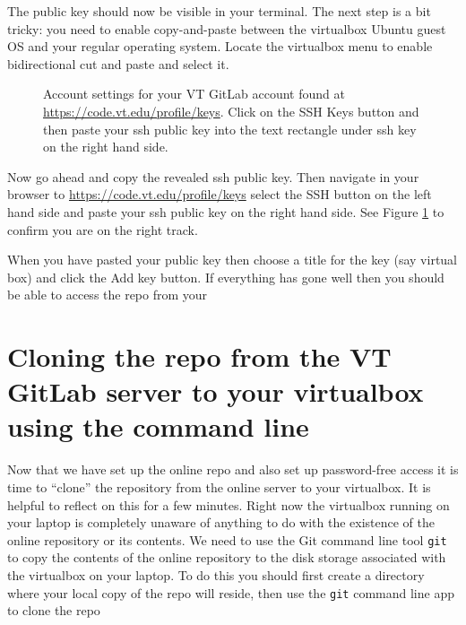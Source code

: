 The public key should now be visible in your terminal. The next step is a bit tricky: you need to enable copy-and-paste between the virtualbox Ubuntu guest OS and your regular operating system. Locate the virtualbox menu to enable bidirectional cut and paste and select it.
\begin{figure}[htbp!]
    \centering
    \caption{Account settings for your VT GitLab account found at \href{https://code.vt.edu/profile/keys}{https://code.vt.edu/profile/keys}. Click on the SSH Keys button and then paste your ssh public key into the text rectangle under ssh key on the right hand side. }
    \label{sshKeyCodeVtEdu.fig}
\end{figure}
Now go ahead and copy the revealed ssh public key. Then navigate in your browser to \href{https://code.vt.edu/profile/keys}{https://code.vt.edu/profile/keys} select the SSH button on the left hand side and paste your ssh public key on the right hand side. See Figure \ref{sshKeyCodeVtEdu.fig} to confirm you are on the right track. 

When you have pasted your public key then choose a title for the key (say virtual box) and click the Add key button. If everything has gone well then you should be able to access the repo from your 


\section{Cloning the repo from the VT GitLab server to your virtualbox using the command line}

Now that we have set up the online repo and also set up password-free access it is time to ``clone'' the repository from the online server to your virtualbox. It is helpful to reflect on this for a few minutes. Right now the virtualbox running on your laptop is completely unaware of anything to do with the existence of the online repository or its contents. We need to use the Git command line tool \verb|git| to copy the contents of the online repository to the disk storage associated with the virtualbox on your laptop. To do this you should first create a directory where your local copy of the repo will reside, then use the \verb|git| command line app to clone the repo


